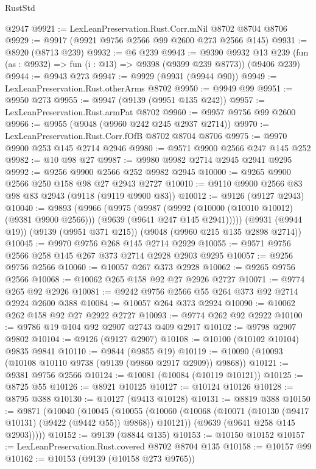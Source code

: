 \begin{lexlean}{RustStd}
\begin{coremodule}
    @2947
@9921 := LexLeanPreservation.Rust.Corr.mNil @8702 @8704 @8706
@9929 := @9917 (@9921 @9756 @2566 @99 @2600 @273 @2566 @145)
@9931 := @8920 (@8713 @239)
@9932 := @6 @239
@9943 := @9390
    @9932
    @13
    @239
    (fun (as : @9932) => fun (i : @13) => @9398 (@9399 @239 @8773))
    (@9406 @239)
@9944 := @9943 @273
@9947 := @9929 (@9931 (@9944 @90))
@9949 := LexLeanPreservation.Rust.otherArms @8702
@9950 := @9949 @99
@9951 := @9950 @273
@9955 := @9947 (@9139 (@9951 @135 @242))
@9957 := LexLeanPreservation.Rust.armPat @8702
@9960 := @9957 @9756 @99 @2600
@9966 := @9955 (@9048 (@9960 @242 @245 @2937 @2714))
@9970 := LexLeanPreservation.Rust.Corr.fOfB @8702 @8704 @8706
@9975 := @9970 @9900 @253 @145 @2714 @2946
@9980 := @9571 @9900 @2566 @247 @145 @252
@9982 := @10 @98 @27
@9987 := @9980 @9982 @2714 @2945 @2941 @9295
@9992 := @9256 @9900 @2566 @252 @9982 @2945
@10000 := @9265 @9900 @2566 @250 @158 @98 @27 @2943 @2727
@10010 := @9110 @9900 @2566 @83 @98 @83 @2943 (@9118 (@9119 @9900 @83))
@10012 := @9126 (@9127 @2943)
@10040 := @9893
    (@9966
      (@9975
        (@9987
          (@9992 (@10000 (@10010 @10012) (@9381 @9900 @2566)))
          (@9639 (@9641 @247 @145 @2941)))))
    (@9931 (@9944 @19))
    (@9139 (@9951 @371 @215))
    (@9048 (@9960 @215 @135 @2898 @2714))
@10045 := @9970 @9756 @268 @145 @2714 @2929
@10055 := @9571 @9756 @2566 @258 @145 @267 @373 @2714 @2928 @2903 @9295
@10057 := @9256 @9756 @2566
@10060 := @10057 @267 @373 @2928
@10062 := @9265 @9756 @2566
@10068 := @10062 @265 @158 @92 @27 @2926 @2727
@10071 := @9774 @265 @92 @2926
@10081 := @9242 @9756 @2566 @55 @264 @373 @92 @2714 @2924 @2600 @388
@10084 := @10057 @264 @373 @2924
@10090 := @10062 @262 @158 @92 @27 @2922 @2727
@10093 := @9774 @262 @92 @2922
@10100 := @9786 @19 @104 @92 @2907 @2743 @409 @2917
@10102 := @9798 @2907 @9802
@10104 := @9126 (@9127 @2907)
@10108 := @10100 (@10102 @10104) @9835 @9841
@10110 := @9844 (@9855 @19)
@10119 := @10090 (@10093 (@10108 @10110 @9738 (@9139 (@9860 @2917 @2909)) @9868))
@10121 := @9381 @9756 @2566
@10124 := @10081 (@10084 (@10119 @10121))
@10125 := @8725 @55
@10126 := @8921 @10125
@10127 := @10124 @10126
@10128 := @8795 @388
@10130 := @10127 (@9413 @10128)
@10131 := @8819 @388
@10150 := @9871
    (@10040
      (@10045
        (@10055
          (@10060 (@10068 (@10071 (@10130 (@9417 @10131) (@9422 (@9442 @55)) @9868)) @10121))
          (@9639 (@9641 @258 @145 @2903)))))
@10152 := @9139 (@8844 @135)
@10153 := @10150 @10152
@10157 := LexLeanPreservation.Rust.covered @8702 @8704 @135
@10158 := @10157 @99
@10162 := @10153 (@9139 (@10158 @273 @9765))

\end{coremodule}
\end{lexlean}
